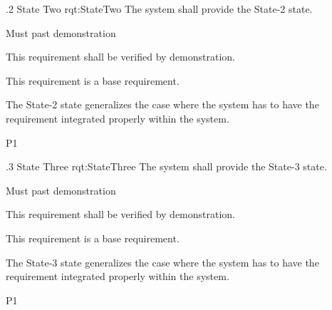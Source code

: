\ONERQMTV
{\RqtNumberBase.2}
{State Two}
{rqt:StateTwo}
{The system shall provide the State-2 state.}
{
	\item [Phase 1] Must past demonstration
}
{This requirement shall be verified by demonstration.}
{
	\item [N/A] This requirement is a base requirement.
}
{
	\item The State-2 state generalizes the case where the system has to have the requirement integrated properly within the system.
}
{P1}


\ONERQMTV
{\RqtNumberBase.3}
{State Three}
{rqt:StateThree}
{The system shall provide the State-3 state.}
{
	\item [Phase 1] Must past demonstration
}
{This requirement shall be verified by demonstration.}
{
	\item [N/A] This requirement is a base requirement.
}
{
	\item The State-3 state generalizes the case where the system has to have the requirement integrated properly within the system.
}
{P1}
